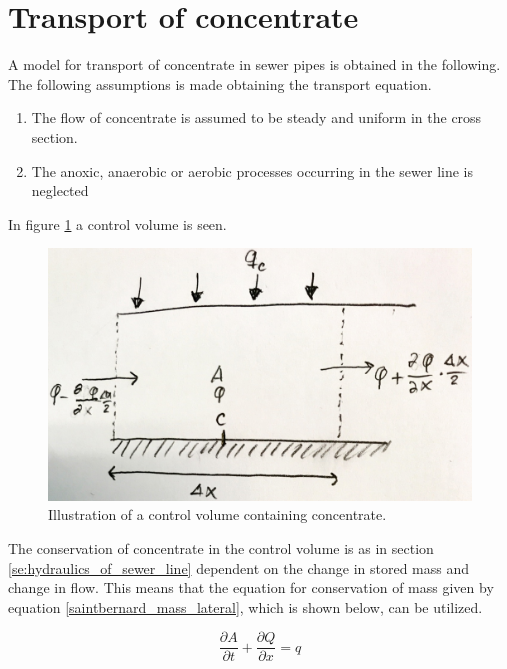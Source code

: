 \section{Transport of concentrate}\label{se:transport_of_concentrate}

A model for transport of concentrate in sewer pipes is obtained in the following.
The following assumptions is made obtaining the transport equation.

 \begin{table}[H]
\begin{enumerate}
	\item The flow of concentrate is assumed to be steady and uniform in the cross section.
	\item The anoxic, anaerobic or aerobic processes occurring in the sewer line is neglected   
\end{enumerate}
\label{tab:concentrate_flow}
\end{table}
 
In figure \ref{fig:poopvolume} a control volume is seen.
\begin{figure}[H]
\centering
\includegraphics[width=.6\textwidth]{report/modeling/pictures/poopvolume2.png}
\caption{Illustration of a control volume containing concentrate.}
\label{fig:poopvolume}
\end{figure} 

The conservation of concentrate in the control volume is as in section \ref{se:hydraulics_of_sewer_line} dependent on the change in stored mass and change in flow. This means that the equation for conservation of mass given by equation \ref{saintbernard_mass_lateral}, which is shown below, can be utilized.

\begin{equation}	
\frac{\partial A}{\partial t} + \frac{\partial Q}{\partial x}=q
\end{equation}

